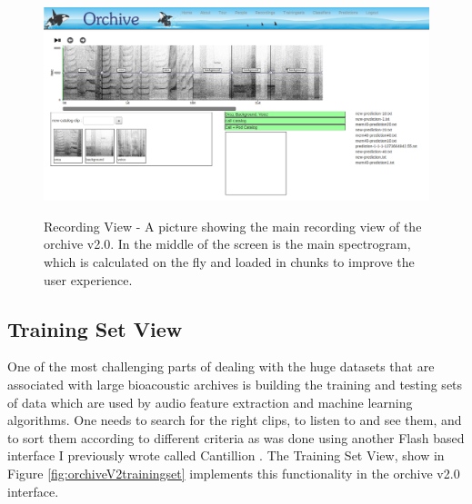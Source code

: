 \documentclass[12pt,oneside]{book}
\begin{document}
\begin{figure}[t]
\centering
\includegraphics[width=\columnwidth]{figures/orchiveV2recording}
\label{fig:orchiveV2recording}
\caption{Recording View - A picture showing the main recording view of
the orchive v2.0.  In the middle of the screen is the main spectrogram,
which is calculated on the fly and loaded in chunks to improve the
user experience.}
\end{figure}


\subsection{Training Set View}

One of the most challenging parts of dealing with the huge datasets
that are associated with large bioacoustic archives is building the
training and testing sets of data which are used by audio feature
extraction and machine learning algorithms.  One needs to search for
the right clips, to listen to and see them, and to sort them according
to different criteria as was done using
another Flash based interface I previously wrote called Cantillion
\cite{biro2012computational}.  The Training Set View, show in Figure
\ref{fig:orchiveV2trainingset} implements this functionality in the
orchive v2.0 interface.
\end{document}
